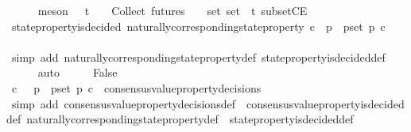 \begin{isabellebody}
\ \ \ \ \isamarkupfalse%
\ {\isacharparenleft}meson\ {\isacartoucheopen}{\isasymsigma}{\isacharprime}\ {\isasymin}\ {\isasymSigma}t\ {\isasymand}\ {\isasymsigma}{\isacharprime}\ {\isasymin}\ {\isasymInter}{\isacharunderscore}Collect\ {\isacharparenleft}futures\ {\isasymsigma}{\isacharparenright}\ {\isacharparenleft}{\isasymsigma}\ {\isasymin}\ {\isasymsigma}{\isacharunderscore}set{\isacharparenright}{\isacartoucheclose}\ {\isacartoucheopen}{\isasymsigma}{\isacharunderscore}set\ {\isasymsubseteq}\ {\isasymSigma}t{\isacartoucheclose}\ subsetCE{\isacharparenright}\isanewline
\ \ \isamarkupfalse%
\ {\isachardoublequoteopen}state{\isacharunderscore}property{\isacharunderscore}is{\isacharunderscore}decided\ {\isacharparenleft}naturally{\isacharunderscore}corresponding{\isacharunderscore}state{\isacharunderscore}property\ {\isacharparenleft}{\isasymlambda}c{\isachardot}\ {\isasymforall}\ p\ {\isasymin}\ p{\isacharunderscore}set{\isachardot}\ p\ c{\isacharparenright}{\isacharcomma}\ {\isasymsigma}{\isacharprime}{\isacharparenright}{\isachardoublequoteclose}\isanewline
\ \ \ \ \isamarkupfalse%
\ {\isacharparenleft}simp\ add{\isacharcolon}\ naturally{\isacharunderscore}corresponding{\isacharunderscore}state{\isacharunderscore}property{\isacharunderscore}def\ state{\isacharunderscore}property{\isacharunderscore}is{\isacharunderscore}decided{\isacharunderscore}def{\isacharparenright}\isanewline
\ \ \ \ \isamarkupfalse%
\ auto\isanewline
\ \ \isamarkupfalse%
\ \isamarkupfalse%
\ False\isanewline
\ \ \ \ \isamarkupfalse%
\ {\isacartoucheopen}{\isacharparenleft}{\isasymlambda}c{\isachardot}\ {\isasymnot}\ {\isacharparenleft}{\isasymforall}\ p\ {\isasymin}\ p{\isacharunderscore}set{\isachardot}\ p\ c{\isacharparenright}{\isacharparenright}\ {\isasymin}\ consensus{\isacharunderscore}value{\isacharunderscore}property{\isacharunderscore}decisions\ {\isasymsigma}{\isacartoucheclose}\ \ \isanewline
\ \ \ \ \isamarkupfalse%
\ {\isacharparenleft}simp\ add{\isacharcolon}\ consensus{\isacharunderscore}value{\isacharunderscore}property{\isacharunderscore}decisions{\isacharunderscore}def\ \ consensus{\isacharunderscore}value{\isacharunderscore}property{\isacharunderscore}is{\isacharunderscore}decided{\isacharunderscore}def\ naturally{\isacharunderscore}corresponding{\isacharunderscore}state{\isacharunderscore}property{\isacharunderscore}def\ \ state{\isacharunderscore}property{\isacharunderscore}is{\isacharunderscore}decided{\isacharunderscore}def{\isacharparenright}\isanewline

\end{isabellebody}
